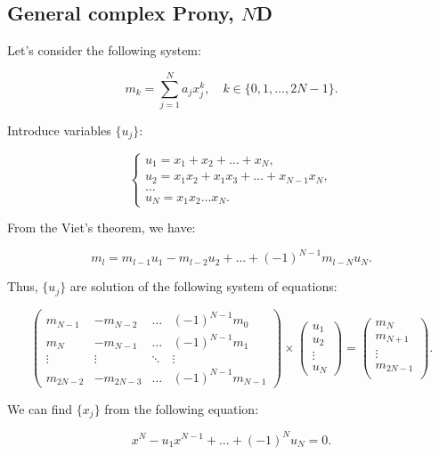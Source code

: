 \subsection{General complex Prony, $N$D}

Let's consider the following system:

$$
  m_k = \sum_{j=1}^N a_j x_j^k, \quad k \in \{0, 1, \ldots, 2N-1\}.
$$

Introduce variables $\{u_j\}$:

$$
  \begin{cases}
    u_1 = x_1 + x_2 + \ldots + x_N, \\
    u_2 = x_1x_2 + x_1x_3 + \ldots + x_{N-1}x_N, \\
    \ldots \\
    u_N = x_1x_2\ldots x_N.
  \end{cases}
$$

From the Viet's theorem, we have:

\begin{equation}
  \label{eq3}
  m_{l} = m_{l-1}u_1 - m_{l-2}u_2 + \ldots + (-1)^{N-1}m_{l-N} u_N.
\end{equation}
 

Thus, $\{u_j\}$ are solution of the following system of equations:

$$
  \begin{pmatrix}
    m_{N-1} & -m_{N-2} & \ldots & (-1)^{N-1} m_0 \\
    m_{N} & -m_{N-1} & \ldots & (-1)^{N-1} m_1 \\
    \vdots & \vdots & \ddots & \vdots \\
    m_{2N-2} & -m_{2N-3} & \ldots & (-1)^{N-1} m_{N-1}
  \end{pmatrix}
  \times
  \begin{pmatrix}
    u_1 \\ u_2 \\ \vdots \\ u_N
  \end{pmatrix}
  =
  \begin{pmatrix}
    m_N \\ m_{N+1} \\ \vdots \\ m_{2N-1} \\
  \end{pmatrix}.
$$

We can find $\{x_j\}$ from the following equation:

$$
  x^N - u_1 x^{N-1} + \ldots + (-1)^N u_N = 0.
$$



